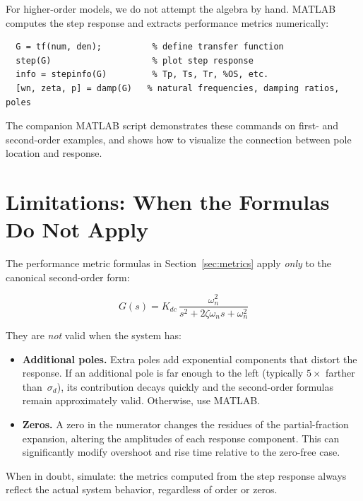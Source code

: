 \documentclass[12pt]{article}
\begin{document}
For higher-order models, we do not attempt the algebra by hand.  MATLAB
computes the step response and extracts performance metrics numerically:

\begin{verbatim}
  G = tf(num, den);          % define transfer function
  step(G)                    % plot step response
  info = stepinfo(G)         % Tp, Ts, Tr, %OS, etc.
  [wn, zeta, p] = damp(G)   % natural frequencies, damping ratios, poles
\end{verbatim}

The companion MATLAB script demonstrates these commands on first- and
second-order examples, and shows how to visualize the connection between
pole location and response.

\section{Limitations: When the Formulas Do Not Apply}
\label{sec:limits}

The performance metric formulas in Section~\ref{sec:metrics} apply
\emph{only} to the canonical second-order form:

\[
  G(s) = K_{dc}\,\frac{\omega_n^2}{s^2 + 2\zeta\omega_n s + \omega_n^2}
\]

They are \emph{not} valid when the system has:
\begin{itemize}
  \item \textbf{Additional poles.}  Extra poles add exponential components
    that distort the response.  If an additional pole is far enough to the
    left (typically $5\times$ farther than~$\sigma_d$), its contribution decays
    quickly and the second-order formulas remain approximately valid.  Otherwise,
    use MATLAB.
  \item \textbf{Zeros.}  A zero in the numerator changes the residues of the
    partial-fraction expansion, altering the amplitudes of each response
    component.  This can significantly modify overshoot and rise time relative
    to the zero-free case.
\end{itemize}

When in doubt, simulate: the metrics computed from the step response always
reflect the actual system behavior, regardless of order or zeros.
\end{document}

